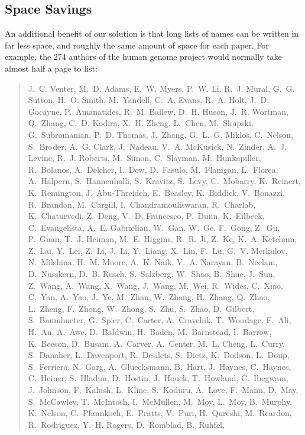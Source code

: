 \documentclass[natbib,authoryear]{sigtbd17-style}
\begin{document}
\subsection{Space Savings}

An additional benefit of our solution is that long lists of names can be
written in far less space, and roughly the same amount of space for each paper.
For example, the 274 authors of the human genome project \cite{human-genome}
would normally take almost half a page to list:

\begin{quote}\sloppy
J.~C. Venter, M.~D. Adams, E.~W. Myers, P.~W. Li, R.~J. Mural, G.~G. Sutton,
  H.~O. Smith, M.~Yandell, C.~A. Evans, R.~A. Holt, J.~D. Gocayne,
  P.~Amanatides, R.~M. Ballew, D.~H. Huson, J.~R. Wortman, Q.~Zhang, C.~D.
  Kodira, X.~H. Zheng, L.~Chen, M.~Skupski, G.~Subramanian, P.~D. Thomas,
  J.~Zhang, G.~L.~G. Miklos, C.~Nelson, S.~Broder, A.~G. Clark, J.~Nadeau,
  V.~A. McKusick, N.~Zinder, A.~J. Levine, R.~J. Roberts, M.~Simon, C.~Slayman,
  M.~Hunkapiller, R.~Bolanos, A.~Delcher, I.~Dew, D.~Fasulo, M.~Flanigan,
  L.~Florea, A.~Halpern, S.~Hannenhalli, S.~Kravitz, S.~Levy, C.~Mobarry,
  K.~Reinert, K.~Remington, J.~Abu-Threideh, E.~Beasley, K.~Biddick,
  V.~Bonazzi, R.~Brandon, M.~Cargill, I.~Chandramouliswaran, R.~Charlab,
  K.~Chaturvedi, Z.~Deng, V.~D. Francesco, P.~Dunn, K.~Eilbeck, C.~Evangelista,
  A.~E. Gabrielian, W.~Gan, W.~Ge, F.~Gong, Z.~Gu, P.~Guan, T.~J. Heiman, M.~E.
  Higgins, R.~R. Ji, Z.~Ke, K.~A. Ketchum, Z.~Lai, Y.~Lei, Z.~Li, J.~Li,
  Y.~Liang, X.~Lin, F.~Lu, G.~V. Merkulov, N.~Milshina, H.~M. Moore, A.~K.
  Naik, V.~A. Narayan, B.~Neelam, D.~Nusskern, D.~B. Rusch, S.~Salzberg,
  W.~Shao, B.~Shue, J.~Sun, Z.~Wang, A.~Wang, X.~Wang, J.~Wang, M.~Wei,
  R.~Wides, C.~Xiao, C.~Yan, A.~Yao, J.~Ye, M.~Zhan, W.~Zhang, H.~Zhang,
  Q.~Zhao, L.~Zheng, F.~Zhong, W.~Zhong, S.~Zhu, S.~Zhao, D.~Gilbert,
  S.~Baumhueter, G.~Spier, C.~Carter, A.~Cravchik, T.~Woodage, F.~Ali, H.~An,
  A.~Awe, D.~Baldwin, H.~Baden, M.~Barnstead, I.~Barrow, K.~Beeson, D.~Busam,
  A.~Carver, A.~Center, M.~L. Cheng, L.~Curry, S.~Danaher, L.~Davenport,
  R.~Desilets, S.~Dietz, K.~Dodson, L.~Doup, S.~Ferriera, N.~Garg,
  A.~Gluecksmann, B.~Hart, J.~Haynes, C.~Haynes, C.~Heiner, S.~Hladun,
  D.~Hostin, J.~Houck, T.~Howland, C.~Ibegwam, J.~Johnson, F.~Kalush, L.~Kline,
  S.~Koduru, A.~Love, F.~Mann, D.~May, S.~McCawley, T.~McIntosh, I.~McMullen,
  M.~Moy, L.~Moy, B.~Murphy, K.~Nelson, C.~Pfannkoch, E.~Pratts, V.~Puri,
  H.~Qureshi, M.~Reardon, R.~Rodriguez, Y.~H. Rogers, D.~Romblad, B.~Ruhfel,

\end{quote}
\end{document}
